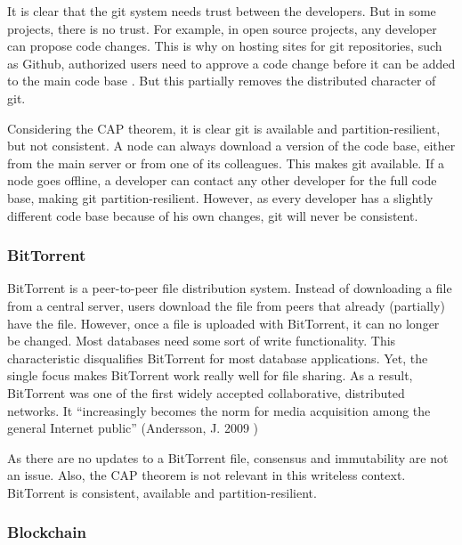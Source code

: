 It is clear that the git system needs trust between the developers. But in some projects, there is no trust. For example, in open source projects, any developer can propose code changes. This is why on hosting sites for git repositories, such as Github, authorized users need to approve a code change before it can be added to the main code base \cite{github-pr}. But this partially removes the distributed character of git.

Considering the CAP theorem, it is clear git is available and partition-resilient, but not consistent. A node can always download a version of the code base, either from the main server or from one of its colleagues. This makes git available. If a node goes offline, a developer can contact any other developer for the full code base, making git partition-resilient. However, as every developer has a slightly different code base because of his own changes, git will never be consistent.

\subsubsection{BitTorrent}

BitTorrent is a peer-to-peer file distribution system. Instead of downloading a file from a central server, users download the file from peers that already (partially) have the file. However, once a file is uploaded with BitTorrent, it can no longer be changed. Most databases need some sort of write functionality. This characteristic disqualifies BitTorrent for most database applications. Yet, the single focus makes BitTorrent work really well for file sharing. As a result, BitTorrent was one of the first widely accepted collaborative, distributed networks. It ``increasingly becomes the norm for media acquisition among the general Internet public'' (Andersson, J. 2009 \cite{bittorrent-norm})

As there are no updates to a BitTorrent file, consensus and immutability are not an issue. Also, the CAP theorem is not relevant in this writeless context. BitTorrent is consistent, available and partition-resilient.

\subsubsection{Blockchain}
\label{subsubsec:blockchain-as-distributed-dbs}

